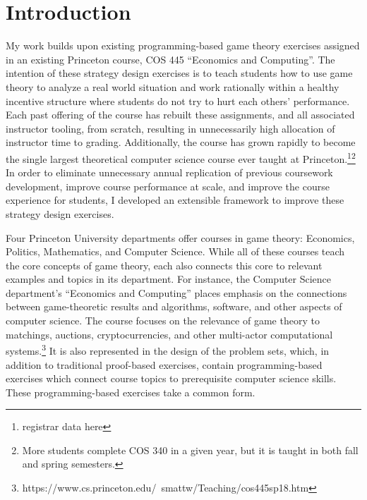 \documentclass[pageno]{jpaper}
\begin{document}
\section*{Introduction}
My work builds upon existing programming-based game theory exercises assigned in an existing Princeton course, COS 445 ``Economics and Computing''.
The intention of these strategy design exercises is to teach students how to use game theory to analyze a real world situation and work rationally within a healthy incentive structure where students do not try to hurt each others’ performance.
Each past offering of the course has rebuilt these assignments, and all associated instructor tooling, from scratch, resulting in unnecessarily high allocation of instructor time to grading.
Additionally, the course has grown rapidly to become the single largest theoretical computer science course ever taught at Princeton.\footnote{registrar data here}\footnote{More students complete COS 340 in a given year, but it is taught in both fall and spring semesters.}
In order to eliminate unnecessary annual replication of previous coursework development, improve course performance at scale, and improve the course experience for students, I developed an extensible framework to improve these strategy design exercises.

Four Princeton University departments offer courses in game theory: Economics, Politics, Mathematics, and Computer Science.
While all of these courses teach the core concepts of game theory, each also connects this core to relevant examples and topics in its department.
For instance, the Computer Science department's ``Economics and Computing'' places emphasis on the connections between game-theoretic results and algorithms, software, and other aspects of computer science.
The course focuses on the relevance of game theory to matchings, auctions, cryptocurrencies, and other multi-actor computational systems.\footnote{https://www.cs.princeton.edu/~smattw/Teaching/cos445sp18.htm}
It is also represented in the design of the problem sets, which, in addition to traditional proof-based exercises, contain programming-based exercises which connect course topics to prerequisite computer science skills.
These programming-based exercises take a common form.
\end{document}

